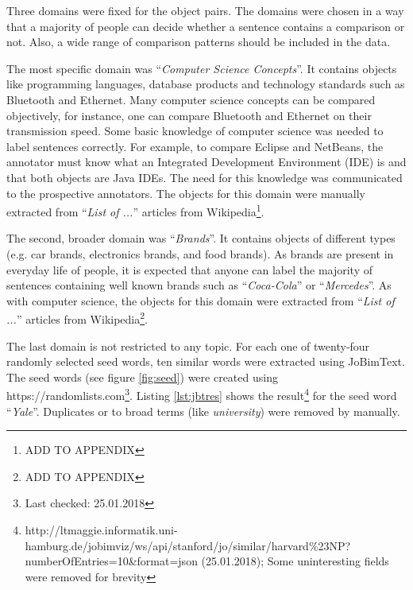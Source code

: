 Three domains were fixed for the object pairs. The domains were chosen in a way that a majority of people can decide whether a sentence contains a comparison or not. Also, a wide range of comparison patterns should be included in the data.

The most specific domain was \enquote{\emph{Computer Science Concepts}}. It contains objects like programming languages, database products and technology standards such as Bluetooth and Ethernet.  Many computer science concepts can be compared objectively, for instance, one can compare Bluetooth and Ethernet on their transmission speed. Some basic knowledge of computer science was needed to label sentences correctly. For example, to compare Eclipse and NetBeans, the annotator must know what an Integrated Development Environment (IDE) is and that both objects are Java IDEs.  The need for this knowledge was communicated to the prospective annotators. The objects for this domain were manually extracted from \enquote{\emph{List of ...}} articles from Wikipedia\footnote{ADD TO APPENDIX}.

The second, broader domain was \enquote{\emph{Brands}}. It contains objects of different types (e.g. car brands, electronics brands, and food brands). As brands are present in everyday life of people, it is expected that anyone can label the majority of sentences containing well known brands such as \enquote{\emph{Coca-Cola}} or \enquote{\emph{Mercedes}}. As with computer science, the objects for this domain were extracted from \enquote{\emph{List of ...}} articles from Wikipedia\footnote{ADD TO APPENDIX}.

The last domain is not restricted to any topic. For each one of twenty-four randomly selected seed words, ten similar words were extracted using JoBimText. The seed words (see figure \ref{fig:seed}) were created using https://randomlists.com\footnote{Last checked: 25.01.2018}. Listing \ref{lst:jbtres} shows the result\footnote{http://ltmaggie.informatik.uni-hamburg.de/jobimviz/ws/api/stanford/jo/similar/harvard\%23NP?numberOfEntries=10&format=json (25.01.2018); Some uninteresting fields were removed for brevity} for the seed word \enquote{\emph{Yale}}. Duplicates or to broad terms (like \emph{university}) were removed by manually.

